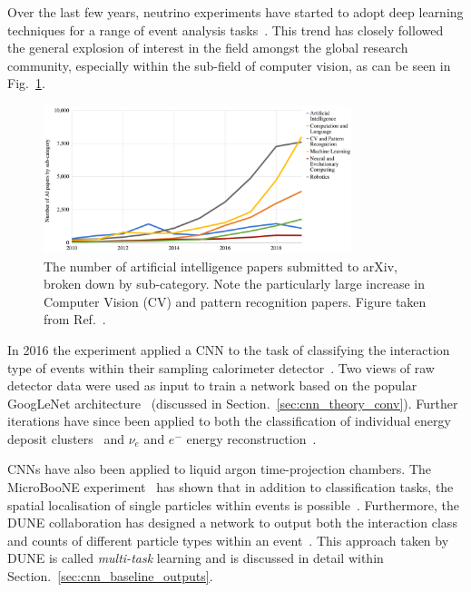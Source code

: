 Over the last few years, neutrino experiments have started to adopt deep learning techniques for a
range of event analysis tasks~\cite{psihas2020}. This trend has closely followed the general
explosion of interest in the field amongst the global research community, especially within the
sub-field of computer vision, as can be seen in Fig.~\ref{fig:papers}.

\begin{figure} %
    \includegraphics[width=0.8\textwidth]{diagrams/6-cnn/papers.pdf}
    \caption[The number of artificial intelligence papers submitted to arXiv]
    {The number of artificial intelligence papers submitted to arXiv, broken down by sub-category.
        Note the particularly large increase in Computer Vision (CV) and pattern recognition
        papers. Figure taken from Ref.~\cite{perrault2019}.}
    \label{fig:papers}
\end{figure}

In 2016 the \nova experiment applied a CNN to the task of classifying the interaction type of
events within their sampling calorimeter detector~\cite{aurisano2016}. Two views of raw detector
data were used as input to train a network based on the popular GoogLeNet
architecture~\cite{szegedy2015} (discussed in Section.~\ref{sec:cnn_theory_conv}). Further \nova
iterations have since been applied to both the classification of individual energy deposit
clusters~\cite{psihas2019} and $\nu_{e}$ and $e^{-}$ energy reconstruction~\cite{baldi2019}.

CNNs have also been applied to liquid argon time-projection chambers. The MicroBooNE
experiment~\cite{acciarri2017_ref} has shown that in addition to classification tasks, the spatial
localisation of single particles within events is possible~\cite{acciarri2017}. Furthermore, the
DUNE collaboration has designed a network to output both the interaction class and counts of
different particle types within an event~\cite{collaboration2020, abi2020}. This approach taken by
DUNE is called \emph{multi-task} learning and is discussed in detail within
Section.~\ref{sec:cnn_baseline_outputs}.

